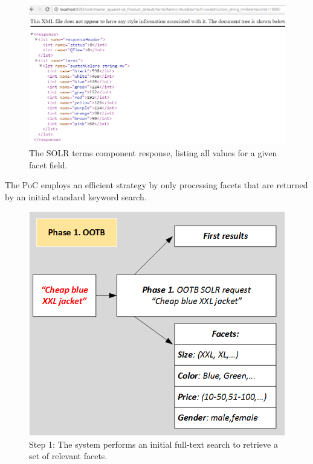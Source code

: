 \documentclass{article}
\begin{document}
    \begin{figure}[H]
        \centering
        \includegraphics[width=\columnwidth]{2017-06-25_22h33_17-1.png}
        \caption{The SOLR terms component response, listing all values for a given facet field.}
        \label{fig:solr_terms}
    \end{figure}

    The PoC employs an efficient strategy by only processing facets that are returned by an initial standard keyword search.
    \begin{figure}[H]
        \centering
        \includegraphics[width=0.8\columnwidth]{searchimproved2.png}
        \caption{Step 1: The system performs an initial full-text search to retrieve a set of relevant facets.}
        \label{fig:process_flow1}
    \end{figure}
\end{document}
